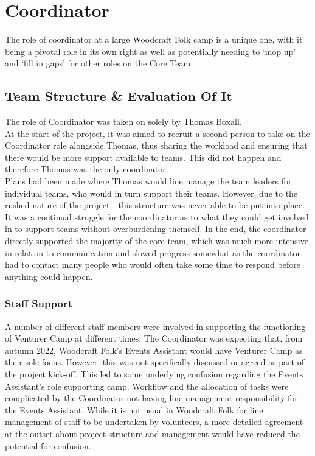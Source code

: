 \chapter{Coordinator}
The role of coordinator at a large Woodcraft Folk camp is a unique one, with it being a pivotal role in its own right as well as potentially needing to `mop up' and `fill in gaps' for other roles on the Core Team.

\section{Team Structure \& Evaluation Of It}
The role of Coordinator was taken on solely by Thomas Boxall.\\

At the start of the project, it was aimed to recruit a second person to take on the Coordinator role alongside Thomas, thus sharing the workload and ensuring that there would be more support available to teams. This did not happen and therefore Thomas was the only coordinator.\\

Plans had been made where Thomas would line manage the team leaders for individual teams, who would in turn support their teams. However, due to the rushed nature of the project - this structure was never able to be put into place. It was a continual struggle for the coordinator as to what they could get involved in to support teams without overburdening themself. In the end, the coordinator directly supported the majority of the core team, which was much more intensive in relation to communication and slowed progress somewhat as the coordinator had to contact many people who would often take some time to respond before anything could happen.

\subsection{Staff Support}
A number of different staff members were involved in supporting the functioning of Venturer Camp at different times. The Coordinator was expecting that, from autumn 2022, Woodcraft Folk's Events Assistant would have Venturer Camp as their sole focus. However, this was not specifically discussed or agreed as part of the project kick-off. This led to some underlying confusion regarding the Events Assistant's role supporting camp. Workflow and the allocation of tasks were complicated by the Coordinator not having line management responsibility for the Events Assistant. While it is not usual in Woodcraft Folk for line management of staff to be undertaken by volunteers, a more detailed agreement at the outset about project structure and management would have reduced the potential for confusion.\\

